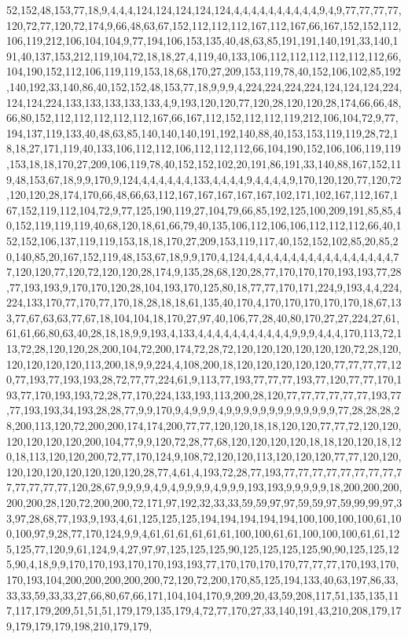 52,152,48,153,77,18,9,4,4,4,124,124,124,124,124,4,4,4,4,4,4,4,4,4,4,9,4,9,77,77,77,77,120,72,77,120,72,174,9,66,48,63,67,152,112,112,112,167,112,167,66,167,152,152,112,106,119,212,106,104,104,9,77,194,106,153,135,40,48,63,85,191,191,140,191,33,140,191,40,137,153,212,119,104,72,18,18,27,4,119,40,133,106,112,112,112,112,112,112,66,104,190,152,112,106,119,119,153,18,68,170,27,209,153,119,78,40,152,106,102,85,192,140,192,33,140,86,40,152,152,48,153,77,18,9,9,9,4,224,224,224,224,124,124,124,224,124,124,224,133,133,133,133,133,4,9,193,120,120,77,120,28,120,120,28,174,66,66,48,66,80,152,112,112,112,112,112,167,66,167,112,152,112,112,119,212,106,104,72,9,77,194,137,119,133,40,48,63,85,140,140,140,191,192,140,88,40,153,153,119,119,28,72,18,18,27,171,119,40,133,106,112,112,106,112,112,112,66,104,190,152,106,106,119,119,153,18,18,170,27,209,106,119,78,40,152,152,102,20,191,86,191,33,140,88,167,152,119,48,153,67,18,9,9,170,9,124,4,4,4,4,4,4,133,4,4,4,4,9,4,4,4,4,9,170,120,120,77,120,72,120,120,28,174,170,66,48,66,63,112,167,167,167,167,167,102,171,102,167,112,167,167,152,119,112,104,72,9,77,125,190,119,27,104,79,66,85,192,125,100,209,191,85,85,40,152,119,119,119,40,68,120,18,61,66,79,40,135,106,112,106,106,112,112,112,66,40,152,152,106,137,119,119,153,18,18,170,27,209,153,119,117,40,152,152,102,85,20,85,20,140,85,20,167,152,119,48,153,67,18,9,9,170,4,124,4,4,4,4,4,4,4,4,4,4,4,4,4,4,4,4,4,77,120,120,77,120,72,120,120,28,174,9,135,28,68,120,28,77,170,170,170,193,193,77,28,77,193,193,9,170,170,120,28,104,193,170,125,80,18,77,77,170,171,224,9,193,4,4,224,224,133,170,77,170,77,170,18,28,18,18,61,135,40,170,4,170,170,170,170,170,18,67,133,77,67,63,63,77,67,18,104,104,18,170,27,97,40,106,77,28,40,80,170,27,27,224,27,61,61,61,66,80,63,40,28,18,18,9,9,193,4,133,4,4,4,4,4,4,4,4,4,4,4,9,9,9,4,4,4,170,113,72,113,72,28,120,120,28,200,104,72,200,174,72,28,72,120,120,120,120,120,120,72,28,120,120,120,120,120,113,200,18,9,9,224,4,108,200,18,120,120,120,120,120,77,77,77,77,120,77,193,77,193,193,28,72,77,77,224,61,9,113,77,193,77,77,77,193,77,120,77,77,170,193,77,170,193,193,72,28,77,170,224,133,193,113,200,28,120,77,77,77,77,77,77,193,77,77,193,193,34,193,28,28,77,9,9,170,9,4,9,9,9,4,9,9,9,9,9,9,9,9,9,9,9,9,9,77,28,28,28,28,200,113,120,72,200,200,174,174,200,77,77,120,120,18,18,120,120,77,77,72,120,120,120,120,120,120,200,104,77,9,9,120,72,28,77,68,120,120,120,120,18,18,120,120,18,120,18,113,120,120,200,72,77,170,124,9,108,72,120,120,113,120,120,120,77,77,120,120,120,120,120,120,120,120,120,28,77,4,61,4,193,72,28,77,193,77,77,77,77,77,77,77,77,77,77,77,77,77,120,28,67,9,9,9,9,4,9,4,9,9,9,9,4,9,9,9,193,193,9,9,9,9,9,18,200,200,200,200,200,28,120,72,200,200,72,171,97,192,32,33,33,59,59,97,97,59,59,97,59,99,99,97,33,97,28,68,77,193,9,193,4,61,125,125,125,194,194,194,194,194,100,100,100,100,61,100,100,97,9,28,77,170,124,9,9,4,61,61,61,61,61,61,100,100,61,61,100,100,100,61,61,125,125,77,120,9,61,124,9,4,27,97,97,125,125,125,90,125,125,125,125,90,90,125,125,125,90,4,18,9,9,170,170,193,170,170,193,193,77,170,170,170,170,77,77,77,170,193,170,170,193,104,200,200,200,200,200,72,120,72,200,170,85,125,194,133,40,63,197,86,33,33,33,59,33,33,27,66,80,67,66,171,104,104,170,9,209,20,43,59,208,117,51,135,135,117,117,179,209,51,51,51,179,179,135,179,4,72,77,170,27,33,140,191,43,210,208,179,179,179,179,179,198,210,179,179,